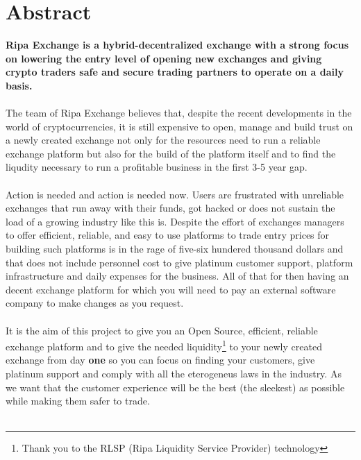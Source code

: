 \documentclass[11pt,fleqn]{book} %
\begin{document}

\begingroup
\thispagestyle{empty}
\endgroup

\newpage
\section{Abstract}
\textbf{Ripa Exchange is a hybrid-decentralized exchange with a strong focus on lowering the entry level
of opening new exchanges and giving crypto traders safe and secure trading partners to operate on a daily basis.}\\\\
The team of Ripa Exchange believes that, despite the recent developments in the world of
cryptocurrencies, it is still expensive to open, manage and build trust on a newly created exchange not
only for the resources need to run a reliable exchange platform but also for the build of the platform 
itself and to find the liqudity necessary to run a profitable business in the first 3-5 year gap.\\\\
Action is needed and action is needed now. Users are frustrated with unreliable exchanges that run away
with their funds, got hacked or does not sustain the load of a growing industry like this is. Despite
the effort of exchanges managers to offer efficient, reliable, and easy to use platforms to trade entry
prices for building such platforms is in the rage of five-six hundered thousand dollars and that does not 
include personnel cost to give platinum customer support, platform infrastructure and daily expenses for
the business. All of that for then having an decent exchange platform for which you will need to pay an 
external software company to make changes as you request.\\\\
It is the aim of this project to give you an Open Source, efficient, reliable exchange platform and to
give the needed liquidity\footnote{Thank you to the RLSP (Ripa Liquidity Service Provider) technology} to your newly created exchange from day \textbf{one} so you can focus on
finding your customers, give platinum support and comply with all the eterogeneus laws in the industry.
As we want that the customer experience will be the best (the sleekest) as possible while making them safer to trade.\\\\
\end{document}
